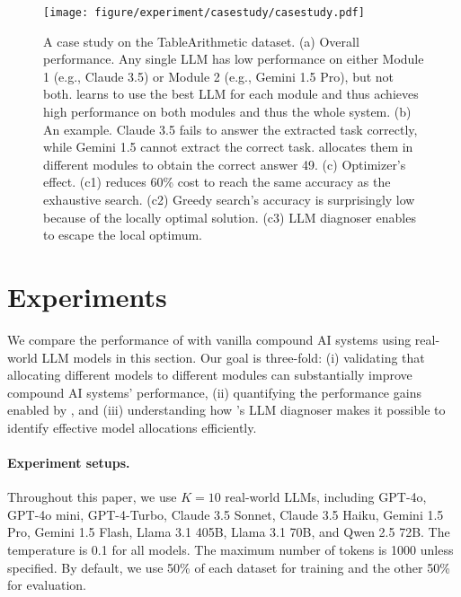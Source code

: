 
\begin{figure*}[ht!]
    \centering
    \texttt{[image: figure/experiment/casestudy/casestudy.pdf]}
    \caption{A case study on the TableArithmetic dataset. (a) Overall performance. Any single LLM has low performance on either Module 1 (e.g., Claude 3.5) or Module 2 (e.g., Gemini 1.5 Pro), but not both. \deluxesystem{} learns to use the best LLM for each module and thus achieves high performance on both modules and thus the whole system. (b) An example. Claude 3.5 fails to answer the extracted task correctly, while Gemini 1.5 cannot extract the correct task. \deluxesystem{} allocates them in different modules to obtain the correct answer 49. (c) Optimizer's effect. (c1) \deluxesystem{} reduces 60\% cost to reach the same accuracy as the exhaustive search. (c2) Greedy search's accuracy is surprisingly low because of the locally optimal solution. (c3) LLM diagnoser enables \deluxesystem{} to escape the local optimum. }
    \label{fig:deluxeagent:casestudy}
\end{figure*}

\section{Experiments}\label{sec:deluxeagent:Exp}
We compare the performance of \deluxesystem{} with vanilla compound AI systems using real-world LLM models in this section. Our goal is three-fold: (i) validating that allocating different models to different modules can substantially improve compound AI systems' performance, (ii) quantifying the performance gains enabled by \deluxesystem{}, and (iii) understanding how \deluxesystem{}'s LLM  diagnoser makes it possible to identify effective model allocations efficiently.


\paragraph{Experiment setups.} Throughout this paper, we use $K=10$ real-world LLMs, including GPT-4o, GPT-4o mini, GPT-4-Turbo, Claude 3.5 Sonnet, Claude 3.5 Haiku, Gemini 1.5 Pro, Gemini 1.5 Flash, Llama 3.1 405B, Llama 3.1 70B, and Qwen 2.5 72B. The temperature is 0.1 for all models. The maximum number of tokens is 1000 unless specified. By default, we use 50\% of each dataset for training and the other 50\% for evaluation. 

